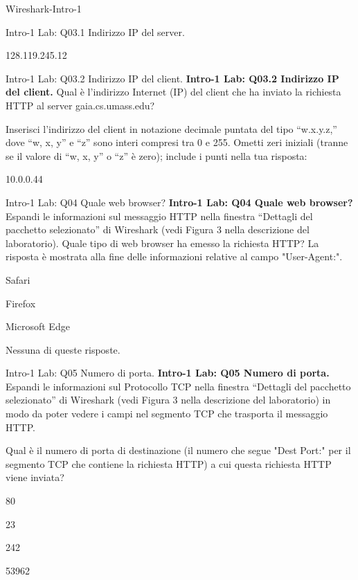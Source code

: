 \documentclass[a4paper]{article}
\begin{document}
\begin{quiz}{Wireshark-Intro-1}
\begin{shortanswer}[points=1]{Intro-1 Lab: Q03.1 Indirizzo IP del server.}
\item 128.119.245.12
\end{shortanswer}

\begin{shortanswer}[points=1]{Intro-1 Lab: Q03.2 Indirizzo IP del client.}
\textbf{Intro-1 Lab: Q03.2 Indirizzo IP del client.}
Qual è l'indirizzo Internet (IP) del client che ha inviato la richiesta HTTP al server gaia.cs.umass.edu?

Inserisci l'indirizzo del client in notazione decimale puntata del tipo ``w.x.y.z,'' dove ``w, x, y'' e ``z'' sono interi compresi tra 0 e 255. Ometti zeri iniziali (tranne se il valore di ``w, x, y'' o ``z'' è zero); include i punti nella tua risposta:

\item 10.0.0.44
\end{shortanswer}

\begin{multi}[points=1]{Intro-1 Lab: Q04 Quale web browser?}
\textbf{Intro-1 Lab: Q04 Quale web browser?}
Espandi le informazioni sul messaggio HTTP nella finestra ``Dettagli del pacchetto selezionato'' di Wireshark (vedi Figura 3 nella descrizione del laboratorio). Quale tipo di web browser ha emesso la richiesta HTTP? La risposta è mostrata alla fine delle informazioni relative al campo "User-Agent:".

\item Safari
\item* Firefox
\item Microsoft Edge
\item Nessuna di queste risposte.
\end{multi}

\begin{multi}[points=1]{Intro-1 Lab: Q05 Numero di porta.}
\textbf{Intro-1 Lab: Q05 Numero di porta.}
Espandi le informazioni sul Protocollo TCP nella finestra ``Dettagli del pacchetto selezionato'' di Wireshark (vedi Figura 3 nella descrizione del laboratorio) in modo da poter vedere i campi nel segmento TCP che trasporta il messaggio HTTP.

Qual è il numero di porta di destinazione (il numero che segue "Dest Port:" per il segmento TCP che contiene la richiesta HTTP) a cui questa richiesta HTTP viene inviata?

\item* 80
\item 23
\item 242
\item 53962
\end{multi}

\end{quiz}
\end{document}
